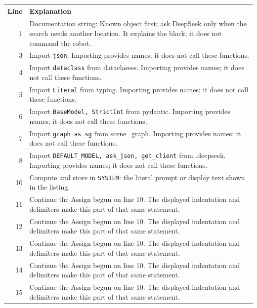 \documentclass[11pt,a4paper]{book}
\begin{document}
\begin{longtable}{r p{}}

\textbf{Line} & \textbf{Explanation} \\ \hline \endhead

1 & Documentation string: Known object first; ask DeepSeek only when the search needs another location. It explains the block; it does not command the robot. \\

3 & Import \texttt{json}. Importing provides names; it does not call these functions. \\

4 & Import \texttt{dataclass} from dataclasses. Importing provides names; it does not call these functions. \\

5 & Import \texttt{Literal} from typing. Importing provides names; it does not call these functions. \\

6 & Import \texttt{BaseModel, StrictInt} from pydantic. Importing provides names; it does not call these functions. \\

7 & Import \texttt{graph as sg} from scene\_graph. Importing provides names; it does not call these functions. \\

8 & Import \texttt{DEFAULT\_MODEL, ask\_json, get\_client} from .deepseek. Importing provides names; it does not call these functions. \\

10 & Compute and store in \texttt{SYSTEM}: the literal prompt or display text shown in the listing.  \\

11 & Continue the Assign begun on line 10. The displayed indentation and delimiters make this part of that same statement. \\

12 & Continue the Assign begun on line 10. The displayed indentation and delimiters make this part of that same statement. \\

13 & Continue the Assign begun on line 10. The displayed indentation and delimiters make this part of that same statement. \\

14 & Continue the Assign begun on line 10. The displayed indentation and delimiters make this part of that same statement. \\

15 & Continue the Assign begun on line 10. The displayed indentation and delimiters make this part of that same statement. \\

\end{longtable}
\end{document}

